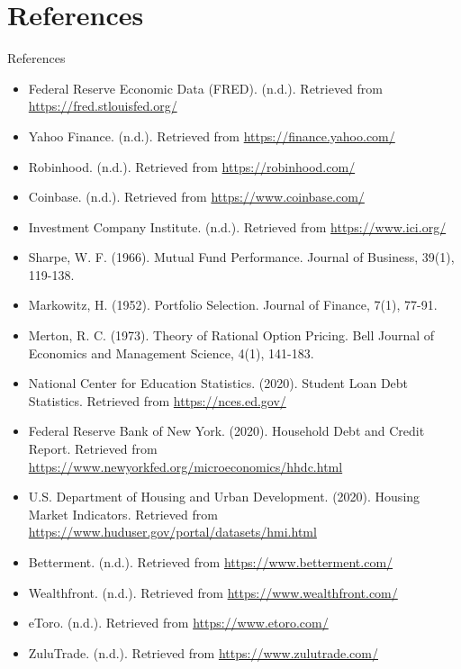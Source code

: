 \documentclass{beamer}
\begin{document}
\section{References}
\begin{frame}{References}
    \begin{itemize}
        \item Federal Reserve Economic Data (FRED). (n.d.). Retrieved from \url{https://fred.stlouisfed.org/}
        \item Yahoo Finance. (n.d.). Retrieved from \url{https://finance.yahoo.com/}
        \item Robinhood. (n.d.). Retrieved from \url{https://robinhood.com/}
        \item Coinbase. (n.d.). Retrieved from \url{https://www.coinbase.com/}
        \item Investment Company Institute. (n.d.). Retrieved from \url{https://www.ici.org/}
        \item Sharpe, W. F. (1966). Mutual Fund Performance. Journal of Business, 39(1), 119-138.
        \item Markowitz, H. (1952). Portfolio Selection. Journal of Finance, 7(1), 77-91.
        \item Merton, R. C. (1973). Theory of Rational Option Pricing. Bell Journal of Economics and Management Science, 4(1), 141-183.
        \item National Center for Education Statistics. (2020). Student Loan Debt Statistics. Retrieved from \url{https://nces.ed.gov/}
        \item Federal Reserve Bank of New York. (2020). Household Debt and Credit Report. Retrieved from \url{https://www.newyorkfed.org/microeconomics/hhdc.html}
        \item U.S. Department of Housing and Urban Development. (2020). Housing Market Indicators. Retrieved from \url{https://www.huduser.gov/portal/datasets/hmi.html}
        \item Betterment. (n.d.). Retrieved from \url{https://www.betterment.com/}
        \item Wealthfront. (n.d.). Retrieved from \url{https://www.wealthfront.com/}
        \item eToro. (n.d.). Retrieved from \url{https://www.etoro.com/}
        \item ZuluTrade. (n.d.). Retrieved from \url{https://www.zulutrade.com/}
    \end{itemize}
\end{frame}
\end{document}

